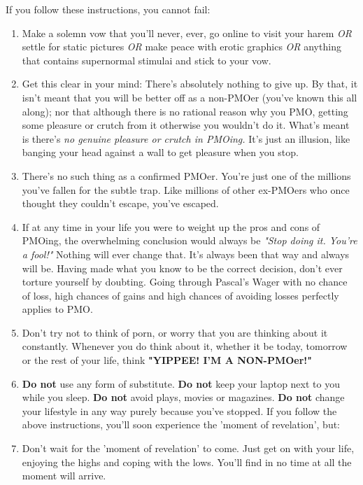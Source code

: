 \documentclass[easypeasy.tex]{subfiles}
\begin{document}
  If you follow these instructions, you cannot fail:
\begin{enumerate}
  \item Make a solemn vow that you'll never, ever, go online to visit your harem \textit{OR} settle for static pictures \textit{OR} make peace with erotic graphics \textit{OR} anything that contains supernormal stimulai and stick to your vow.

    \item Get this clear in your mind: There's absolutely nothing to give up. By that, it isn't meant that you will be better off as a non-PMOer (you've known this all along); nor that although there is no rational reason why you PMO, getting some pleasure or crutch from it otherwise you wouldn't do it. What's meant is there's \textit{no genuine pleasure or crutch in PMOing.} It's just an illusion, like banging your head against a wall to get pleasure when you stop.

    \item There's no such thing as a confirmed PMOer. You're just one of the millions you've fallen for the subtle trap. Like millions of other ex-PMOers who once thought they couldn't escape, you've escaped.

    \item If at any time in your life you were to weight up the pros and cons of PMOing, the overwhelming conclusion would always be \textit{"Stop doing it. You're a fool!"} Nothing will ever change that. It's always been that way and always will be. Having made what you know to be the correct decision, don't ever torture yourself by doubting. Going through Pascal's Wager with no chance of loss, high chances of gains and high chances of avoiding losses perfectly applies to PMO.

    \item Don't try not to think of porn, or worry that you are thinking about it constantly. Whenever you do think about it, whether it be today, tomorrow or the rest of your life, think \textbf{"YIPPEE! I'M A NON-PMOer!"}

    \item \textbf{Do not} use any form of substitute. \textbf{Do not} keep your laptop next to you while you sleep. \textbf{Do not} avoid plays, movies or magazines. \textbf{Do not} change your lifestyle in any way purely because you've stopped. If you follow the above instructions, you'll soon experience the 'moment of revelation', but:

    \item Don't wait for the 'moment of revelation' to come. Just get on with your life, enjoying the highs and coping with the lows. You'll find in no time at all the moment will arrive.
\end{enumerate}
\end{document}
